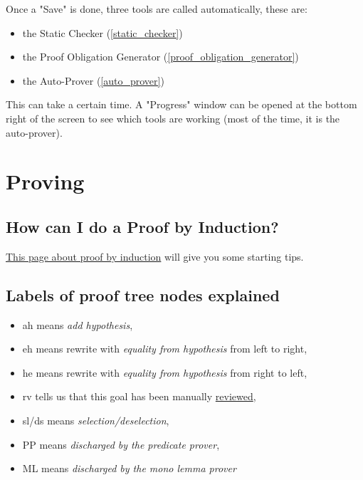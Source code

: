 Once a "Save" is done, three tools are called automatically, these are:

\begin{itemize}
	\item the Static Checker (\ref{static_checker})
	\item the Proof Obligation Generator (\ref{proof_obligation_generator})
	\item the Auto-Prover (\ref{auto_prover})
\end{itemize}

This can take a certain time. A "Progress" window can be opened at the bottom right of the screen to see which tools are working (most of the time, it is the auto-prover). 

\section{Proving}

\subsection{How can I do a Proof by Induction?}

\href{http://wiki.event-b.org/index.php/Induction_proof}{This page about proof by induction} will give you some starting tips.

\subsection{Labels of proof tree nodes explained}

\begin{itemize}
	\item \textsf{ah} means \textit{add hypothesis},
	\item \textsf{eh} means rewrite with \textit{equality from hypothesis} from left to right,
	\item \textsf{he} means rewrite with \textit{equality from hypothesis} from right to left,
	\item \textsf{rv} tells us that this goal has been manually \href{http://wiki.event-b.org/index.php/The_Proving_Perspective_(Rodin_User_Manual)#The_Proof_Control_Window}{reviewed},
	\item \textsf{sl/ds} means \textit{selection/deselection},
	\item \textsf{PP} means \textit{discharged by the predicate prover},
	\item \textsf{ML} means \textit{discharged by the mono lemma prover}
\end{itemize}

